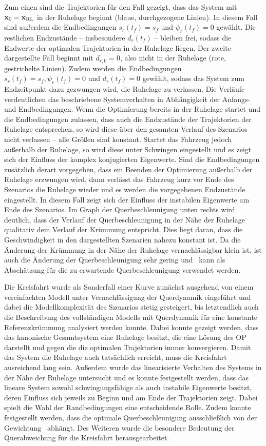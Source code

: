 Zum einen sind die Trajektorien für den Fall gezeigt, dass das System mit $\boldsymbol{\mathrm{x}}_0 = \boldsymbol{\mathrm{x}}_{\textrm{RL}}$ in der Ruhelage beginnt (blaue, durchgezogene Linien). In diesem Fall sind außerdem die Endbedingungen $s_r(t_f) = s_f$ und $\psi_r(t_f) = 0$ gewählt. Die restlichen Endzustände -- insbesondere $d_r(t_f)$ -- bleiben frei, sodass die Endwerte der optimalen Trajektorien in der Ruhelage liegen. Der zweite dargestellte Fall beginnt mit $d_{r,0} = 0$, also nicht in der Ruhelage (rote, gestrichelte Linien). Zudem werden die Endbedingungen $s_r(t_f) = s_f, \psi_r(t_f) = 0$ und $d_r(t_f) = 0$ gewählt, sodass das System zum Endzeitpunkt dazu gezwungen wird, die Ruhelage zu verlassen. Die Verläufe verdeutlichen das beschriebene Systemverhalten in Abhängigkeit der Anfangs- und Endbedingungen. Wenn die Optimierung bereits in der Ruhelage startet und die Endbedingungen zulassen, dass auch die Endzustände der Trajektorien der Ruhelage entsprechen, so wird diese über den gesamten Verlauf des Szenarios nicht verlassen --  alle Größen sind konstant. Startet das Fahrzeug jedoch außerhalb der Ruhelage, so wird diese unter Schwingen eingestellt und es zeigt sich der Einfluss der komplex konjugierten Eigenwerte. Sind die Endbedingungen zusätzlich derart vorgegeben, dass ein Beenden der Optimierung außerhalb der Ruhelage erzwungen wird, dann verlässt das Fahrzeug kurz vor Ende des Szenarios die Ruhelage wieder und es werden die vorgegebenen Endzustände eingestellt. In diesem Fall zeigt sich der Einfluss der instabilen Eigenwerte am Ende des Szenarios. Im Graph der Querbeschleunigung unten rechts wird deutlich, dass der Verlauf der Querbeschleunigung in der Nähe der Ruhelage qualitativ dem Verlauf der Krümmung entspricht. Dies liegt daran, dass die Geschwindigkeit in den dargestellten Szenarien nahezu konstant ist. Da die Änderung der Krümmung in der Nähe der Ruhelage vernachlässigbar klein ist, ist auch die Änderung der Querbeschleunigung sehr gering und \ayRL~kann als Abschätzung für die zu erwartende Querbeschleunigung verwendet werden. 

Die Kreisfahrt wurde als Sonderfall einer Kurve zunächst ausgehend von einem vereinfachten Modell unter Vernachlässigung der Querdynamik eingeführt und dabei die Modellkomplexität des Szenarios stetig gesteigert, bis letztendlich auch die Beschreibung des vollständigen Modells mit Querdynamik für eine konstante Referenzkrümmung analysiert werden konnte. Dabei konnte gezeigt werden, dass das kanonische Gesamtsystem eine Ruhelage besitzt, die eine Lösung des \gls{OP} darstellt und gegen die die optimalen Trajektorien immer konvergieren. Damit das System die Ruhelage auch tatsächlich erreicht, muss die Kreisfahrt ausreichend lang sein. Außerdem wurde das linearisierte Verhalten des Systems in der Nähe der Ruhelage untersucht und es konnte festgestellt werden, dass das lineare System sowohl schwingungsfähige als auch instabile Eigenwerte besitzt, deren Einfluss sich jeweils zu Beginn und am Ende der Trajektorien zeigt. Dabei spielt die Wahl der Randbedingungen eine entscheidende Rolle. Zudem konnte festgestellt werden, dass die optimale Querbeschleunigung ausschließlich von der Gewichtung \fay~abhängt. Des Weiteren wurde die besondere Bedeutung der Querabweichung für die Kreisfahrt herausgearbeitet. 

